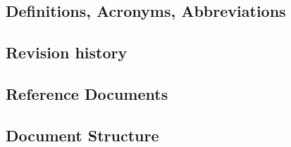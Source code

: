 \subsection{Definitions, Acronyms, Abbreviations}
\subsection{Revision history}
\subsection{Reference Documents}
\subsection{Document Structure}